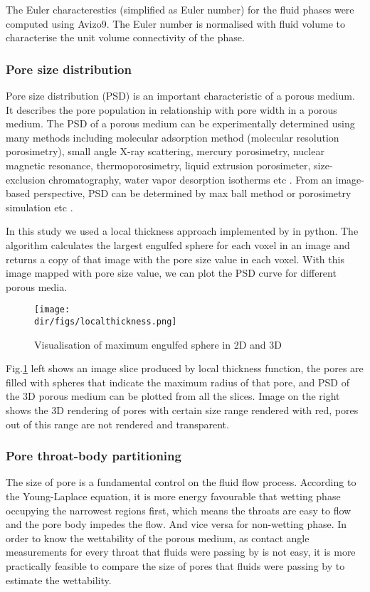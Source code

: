 The Euler characterestics (simplified as Euler number) for the fluid phases were computed using Avizo9\texttrademark. The Euler number is normalised with fluid volume to characterise the unit volume connectivity of the phase.

\subsubsection{Pore size distribution}
Pore size distribution (PSD) is an important characteristic of a porous medium. It describes the pore population in relationship with pore width in a porous medium. The PSD of a porous medium can be experimentally determined using many methods including molecular adsorption method (molecular resolution porosimetry), small angle X-ray scattering, mercury porosimetry, nuclear magnetic resonance, thermoporosimetry, liquid extrusion porosimeter, size-exclusion chromatography, water vapor desorption isotherms etc \citep{kaneko1994determination, yang2009image}. From an image-based perspective, PSD can be determined by max ball method or porosimetry simulation etc \citep[e.g.]{delerue1999new,yang2009image,gostickporespy}. 

In this study we used a local thickness approach implemented by \cite{gostickporespy} in python. The algorithm calculates the largest engulfed sphere for each voxel in an image and returns a copy of that image with the pore size value in each voxel. With this image mapped with pore size value, we can plot the PSD curve for different porous media. 

\begin{figure}[htbp]
  \centering
  \texttt{[image: \\dir/figs/localthickness.png]}
  \caption{Visualisation of maximum engulfed sphere in 2D and 3D}
  \label{localthickness}
\end{figure}

Fig.\ref{localthickness} left shows an image slice produced by local thickness function, the pores are filled with spheres that indicate the maximum radius of that pore, and PSD of the 3D porous medium can be plotted from all the slices. Image on the right shows the 3D rendering of pores with certain size range rendered with red, pores out of this range are not rendered and transparent.

\subsubsection{Pore throat-body partitioning}
The size of pore is a fundamental control on the fluid flow process. According to the Young-Laplace equation, it is more energy favourable that wetting phase occupying the narrowest regions first, which means the throats are easy to flow and the pore body impedes the flow. And vice versa for non-wetting phase. In order to know the wettability of the porous medium, as contact angle measurements for every throat that fluids were passing by is not easy, it is more practically feasible to compare the size of pores that fluids were passing by to estimate the wettability.

